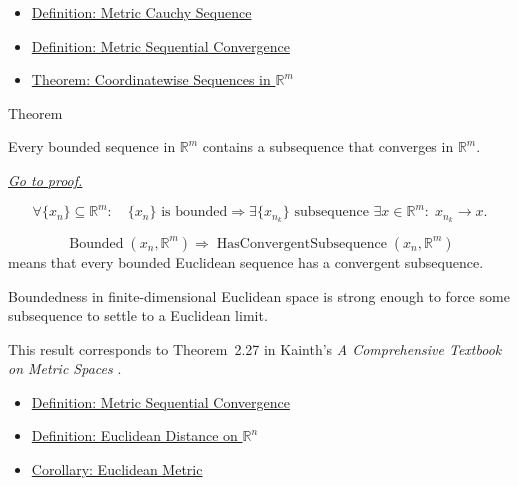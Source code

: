 \begin{dependencies}
\begin{itemize}
  \item \hyperref[def:metric-cauchy-sequence]{Definition: Metric Cauchy Sequence}
  \item \hyperref[def:metric-sequential-convergence]{Definition: Metric Sequential Convergence}
  \item \hyperref[thm:metric-euclidean-coordinatewise-sequences]{Theorem: Coordinatewise Sequences in \(\mathbb{R}^m\)}
\end{itemize}
\end{dependencies}

\begin{theorembox}{Theorem}
\begin{theorem}
\label{thm:metric-euclidean-bolzano-weierstrass}
Every bounded sequence in \(\mathbb{R}^m\) contains a subsequence that
converges in \(\mathbb{R}^m\).

\smallskip
\noindent
\hyperref[prf:metric-euclidean-bolzano-weierstrass]{\textit{Go to proof.}}
\end{theorem}
\end{theorembox}

\begin{remark*}
\[
\forall \{x_n\}\subseteq\mathbb{R}^m{:}\quad
\{x_n\}\text{ is bounded}
\Longrightarrow
\exists\{x_{n_k}\}\text{ subsequence }\exists x\in\mathbb{R}^m{:}\;
x_{n_k}\to x.
\]
\end{remark*}

\begin{remark*}
\[
\operatorname{Bounded}(x_n,\mathbb{R}^m)
\Longrightarrow
\operatorname{HasConvergentSubsequence}(x_n,\mathbb{R}^m)
\]
means that every bounded Euclidean sequence has a convergent subsequence.
\end{remark*}

\begin{remark*}[Interpretation]
Boundedness in finite-dimensional Euclidean space is strong enough to force
some subsequence to settle to a Euclidean limit.
\end{remark*}

\begin{remark*}
This result corresponds to Theorem~2.27 in Kainth's
\emph{A Comprehensive Textbook on Metric Spaces}
\cite{KainthComprehensiveMetricSpaces2023}.
\end{remark*}

\begin{dependencies}
\begin{itemize}
  \item \hyperref[def:metric-sequential-convergence]{Definition: Metric Sequential Convergence}
  \item \hyperref[def:euclidean-distance-rn]{Definition: Euclidean Distance on \(\mathbb{R}^n\)}
  \item \hyperref[cor:euclidean-metric]{Corollary: Euclidean Metric}
\end{itemize}
\end{dependencies}
